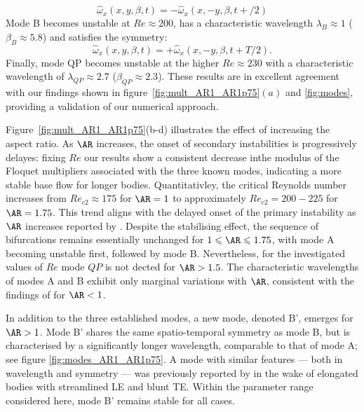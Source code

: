 %
\begin{equation}
  \hat{\omega}_x(x,y,\beta,t) = - \hat{\omega}_x(x,-y,\beta,t+/2)
\end{equation}
%
Mode B becomes unstable at $Re \approx 200$, has a characteristic wavelength $\lambda_B \approx 1$ ($\beta_B \approx 5.8$) and satisfies the symmetry:
%
\begin{equation}
  \hat{\omega}_x(x,y,\beta,t) = + \hat{\omega}_x(x,-y,\beta,t+T/2).
\end{equation}
%
Finally, mode QP becomes unstable at the higher $Re \approx 230$ with a characteristic wavelength of $\lambda_{QP} \approx 2.7$ ($\beta_{QP} \approx 2.3$). These results are in excellent agreement with our findings shown in figure~\ref{fig:mult_AR1_AR1p75}$(a)$ and \ref{fig:modes}, providing a validation of our numerical approach.

Figure~\ref{fig:mult_AR1_AR1p75}(b-d) illustrates the effect of increasing the aspect ratio. As $\AR$ increases, the onset of secondary instabilities is progressively delayes: fixing $Re$ our results show a consistent decrease inthe modulus of the Floquet multipliers associated with the three known modes, indicating a more stable base flow for longer bodies. Quantitativley, the critical Reynolds number increases from $Re_{c2} \approx 175$ for $\AR=1$ to approximately $Re_{c2} =200-225$ for $\AR=1.75$. This trend aligns with the delayed onset of the primary instability as $\AR$ increases reported by \cite{chiarini-quadrio-auteri-2021}. Despite the stabilising effect, the sequence of bifurcations remains essentially unchanged for $1 \le \AR \le 1.75$, with mode A becoming unstable first, followed by mode B. Nevertheless, for the investigated values of $Re$ mode $QP$ is not dected for $\AR>1.5$. The characteristic wavelengths of modes A and B exhibit only marginal variations with $\AR$, consistent with the findings of \cite{choi-yang-2014} for $\AR<1$. 

In addition to the three established modes, a new mode, denoted B', emerges for $\AR>1$. Mode B' shares the same spatio-temporal symmetry as mode B, but is characterised by a significantly longer wavelength, comparable to that of mode A; see figure \ref{fig:modes_AR1_AR1p75}. A mode with similar features --- both in wavelength and symmetry --- was previously reported by \cite{ryan-etal-2006} in the wake of elongated bodies with streamlined LE and blunt TE. Within the parameter range considered here, mode B' remains stable for all cases.

